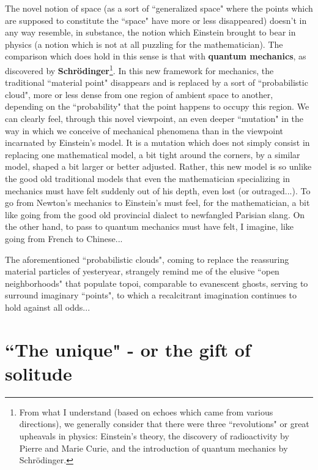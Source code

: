 The novel notion of space (as a sort of ``generalized space" where the points which are supposed to constitute the ``space" have more or less disappeared) doesn't in any way resemble, in substance, the notion which Einstein brought to bear in physics (a notion which is not at all puzzling for the mathematician). The comparison which does hold in this sense is that with \textbf{quantum mechanics}, as discovered by \textbf{Schr\"odinger}\footnote{From what I understand (based on echoes which came from various directions), we generally consider that there were three ``revolutions" or great upheavals in physics: Einstein's theory, the discovery of radioactivity by Pierre and Marie Curie, and the introduction of quantum mechanics by Schr\"odinger.}. In this new framework for mechanics, the traditional ``material point" disappears and is replaced by a sort of ``probabilistic cloud", more or less dense from one region of ambient space to another, depending on the ``probability" that the point happens to occupy this region. We can clearly feel, through this novel viewpoint, an even deeper ``mutation" in the way in which we conceive of mechanical phenomena than in the viewpoint incarnated by Einstein's model. It is a mutation which does not simply consist in replacing one mathematical model, a bit tight around the corners, by a similar model, shaped a bit larger or better adjusted. Rather, this new model is so unlike the good old traditional models that even the mathematician specializing in mechanics must have felt suddenly out of his depth, even lost (or outraged...). To go from Newton's mechanics to Einstein's must feel, for the mathematician, a bit like going from the good old provincial dialect to newfangled Parisian slang. On the other hand, to pass to quantum mechanics must have felt, I imagine, like going from French to Chinese...

The aforementioned ``probabilistic clouds", coming to replace the reassuring material particles of yesteryear, strangely remind me of the elusive ``open neighborhoods" that populate topoi, comparable to evanescent ghosts, serving to surround imaginary ``points", to which a recalcitrant imagination continues to hold against all odds...

\section{``The unique" - or the gift of solitude} 

